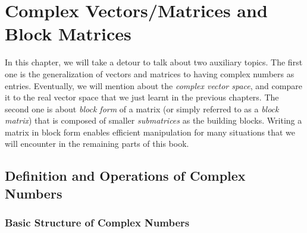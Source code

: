 \chapter{Complex Vectors/Matrices and Block Matrices}
\label{chap:complex}

In this chapter, we will take a detour to talk about two auxiliary topics. The first one is the generalization of vectors and matrices to having complex numbers as entries. Eventually, we will mention about the \textit{complex vector space}, and compare it to the real vector space that we just learnt in the previous chapters. The second one is about \textit{block form} of a matrix (or simply referred to as a \textit{block matrix}) that is composed of smaller \textit{submatrices} as the building blocks. Writing a matrix in block form enables efficient manipulation for many situations that we will encounter in the remaining parts of this book.

\section{Definition and Operations of Complex Numbers}
\label{section:complexno}

\subsection{Basic Structure of Complex Numbers} 

